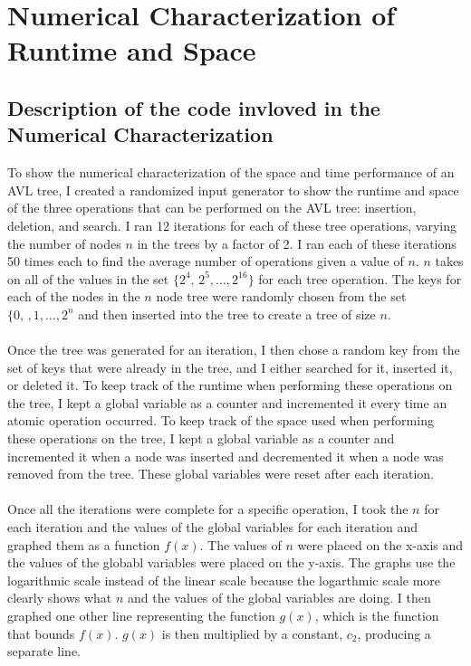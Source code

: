 \documentclass[12pt]{article}
\begin{document}
\section*{Numerical Characterization of Runtime and Space}

\subsection*{Description of the code invloved in the Numerical Characterization}
To show the numerical characterization of the space and time performance of an
AVL tree, I created a randomized input generator to show the runtime and space
of the three operations that can be performed on the AVL tree: insertion,
deletion, and search.  I ran 12 iterations for each of these tree operations,
varying the number of nodes $n$ in the trees by a factor of 2.  I ran each of
these iterations 50 times each to find the average number of operations given a
value of $n$.  $n$ takes on all of the values in the set
$\{2^4,\,2^5,\ldots,2^{16}\}$ for each tree operation.
The keys for each of the nodes in the $n$ node tree were randomly chosen from 
the set $\{0,\,,1,\ldots,2^n$ and then inserted into the tree to create a tree of size $n$.\\
\\
Once the tree was generated for an iteration, I then chose a random key
from the set of keys that were already in the tree, and I either searched for
it, inserted it, or deleted it.  To keep track of the runtime when performing
these operations on the tree, I kept a global variable as a counter and
incremented it every time an atomic operation occurred.  To keep track of the space used when
performing these operations on the tree, I kept a global variable as a counter
and incremented it when a node was inserted and decremented it when a node was
removed from the tree.  These global variables were reset after each
iteration.\\
\\
Once all the iterations were complete for a specific operation, I took the $n$
for each iteration and the values of the global variables for each iteration and
graphed them as a function $f(x)$.  The values of $n$ were placed on the
x-axis and the values of the globabl variables were placed on the y-axis.  The graphs use the logarithmic
scale instead of the linear scale because the logarthmic scale more clearly
shows what $n$ and the values of the global variables are doing.
I then graphed one other line representing the function $g(x)$, which is
the function that bounds $f(x)$. $g(x)$ is then
multiplied by a constant, $c_2$, producing a separate line.
\end{document}
